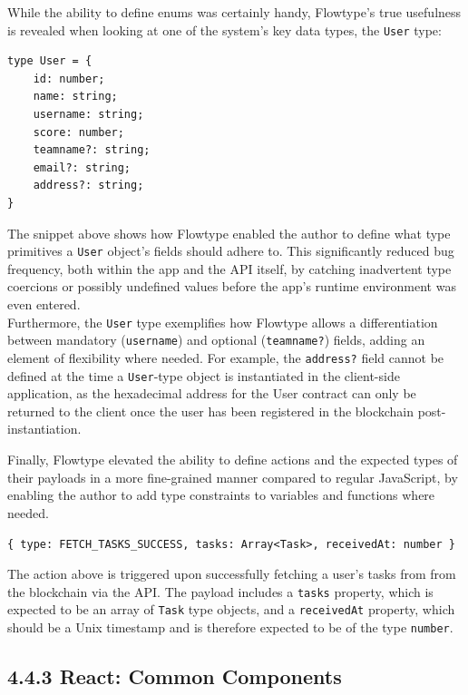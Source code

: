 \documentclass[12pt]{report}
\begin{document}
While the ability to define enums was certainly handy, Flowtype's true
usefulness is revealed when looking at one of the system's key data
types, the \texttt{User} type:

\begin{verbatim}
type User = {
    id: number;
    name: string;
    username: string;
    score: number;
    teamname?: string;
    email?: string;
    address?: string;
}
\end{verbatim}

The snippet above shows how Flowtype enabled the author to define what
type primitives a \texttt{User} object's fields should adhere to. This
significantly reduced bug frequency, both within the app and the API
itself, by catching inadvertent type coercions or possibly undefined
values before the app's runtime environment was even entered.\\
Furthermore, the \texttt{User} type exemplifies how Flowtype allows a
differentiation between mandatory (\texttt{username}) and optional
(\texttt{teamname?}) fields, adding an element of flexibility where
needed. For example, the \texttt{address?} field cannot be defined at
the time a \texttt{User}-type object is instantiated in the client-side
application, as the hexadecimal address for the User contract can only
be returned to the client once the user has been registered in the
blockchain post-instantiation.

Finally, Flowtype elevated the ability to define actions and the
expected types of their payloads in a more fine-grained manner compared
to regular JavaScript, by enabling the author to add type constraints to
variables and functions where needed.

\texttt{\{\ type:\ \textquotesingle{}FETCH\_TASKS\_SUCCESS\textquotesingle{},\ tasks:\ Array\textless{}Task\textgreater{},\ receivedAt:\ number\ \}}

The action above is triggered upon successfully fetching a user's tasks
from from the blockchain via the API. The payload includes a
\texttt{tasks} property, which is expected to be an array of
\texttt{Task} type objects, and a \texttt{receivedAt} property, which
should be a Unix timestamp and is therefore expected to be of the type
\texttt{number}.

\subsection{4.4.3 React: Common
Components}\label{react-common-components}
\end{document}
